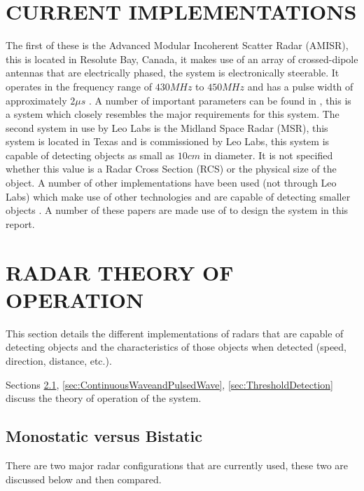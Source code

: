 \documentclass[11pt]{witseiepaper}
\begin{document}
\begin{bibunit}[witseie]
\section{CURRENT IMPLEMENTATIONS} \label{sec:CurrentImplementations}
 The first of these is the Advanced Modular Incoherent Scatter Radar (AMISR), this is located in Resolute Bay, Canada, it makes use of an array of crossed-dipole antennas that are electrically phased, the system is electronically steerable. It operates in the frequency range of $430 MHz$ to $450 MHz$ and has a pulse width of approximately $2 \mu s$ \cite{AMISR}. A number of important parameters can be found in \cite{AMISR}, this is a system which closely resembles the major requirements for this system.
The second system in use by Leo Labs is the Midland Space Radar (MSR), this system is located in Texas and is commissioned by Leo Labs, this system is capable of detecting objects as small as $10 cm$ in diameter. It is not specified whether this value is a Radar Cross Section  (RCS) or the physical size of the object.
A number of other implementations have been used (not through Leo Labs) which make use of other technologies and are capable of detecting smaller objects \cite{EISCAT, SIMO, telescope, BeamForming, OrbitDetermination, PlanarArray}. A number of these papers are made use of to design the system in this report.


\section{RADAR THEORY OF OPERATION} \label{sec:RadarTheoryOfOperation}
This section details the different implementations of radars that are capable of detecting objects and the characteristics of those objects when detected (speed, direction, distance, etc.).

Sections \ref{sec:MonostaticvsBistatic}, \ref{sec:ContinuousWaveandPulsedWave}, \ref{sec:ThresholdDetection} discuss the theory of operation of the system.

\subsection{Monostatic versus Bistatic} \label{sec:MonostaticvsBistatic}
There are two major radar configurations that are currently used, these two are discussed below and then compared.


\end{bibunit}
\end{document}
